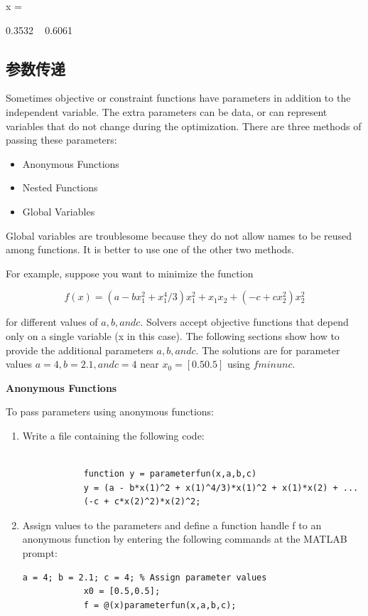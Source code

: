 \documentclass[cn,10pt,math=newtx,citestyle=gb7714-2015,bibstyle=gb7714-2015]{elegantbook}
\begin{document}
{{	
	x =
	
	0.3532  ~  0.6061
	
	\subsection{参数传递}
	
	Sometimes objective or constraint functions have parameters in addition to the independent variable. The extra parameters can be data, or can represent variables that do not change during the optimization. There are three methods of passing these parameters:
	
	\begin{itemize}
		\item Anonymous Functions
		
		\item Nested Functions
		
		\item Global Variables
		
		
	\end{itemize}
	
	Global variables are troublesome because they do not allow names to be reused among functions. It is better to use one of the other two methods.
	
	For example, suppose you want to minimize the function
	
	$$f(x)=(a-bx_1^2+x_1^4/3)x_1^2+x_1x_2+(-c+cx_2^2)x_2^2$$
	
	for different values of $a, b, and c$. Solvers accept objective functions that depend only on a single variable (x in this case). The following sections show how to provide the additional parameters $a, b, and c$. The solutions are for parameter values $a = 4, b = 2.1, and c = 4$ near $x_0 = [0.5 0.5]$ using $fminunc$.
	
	\textbf{Anonymous Functions}
	
	To pass parameters using anonymous functions:
	
	\begin{enumerate}
		\item Write a file containing the following code:
		\begin{lstlisting}[frame=shadowbox]
			
			function y = parameterfun(x,a,b,c)
			y = (a - b*x(1)^2 + x(1)^4/3)*x(1)^2 + x(1)*x(2) + ...
			(-c + c*x(2)^2)*x(2)^2;
		\end{lstlisting}
		
		\item Assign values to the parameters and define a function handle f to an anonymous function by entering the following commands at the MATLAB prompt:
		\begin{lstlisting}[frame=shadowbox]
			a = 4; b = 2.1; c = 4; % Assign parameter values
			x0 = [0.5,0.5];
			f = @(x)parameterfun(x,a,b,c);
		\end{lstlisting}
		

\end{enumerate}}}
\end{document}

